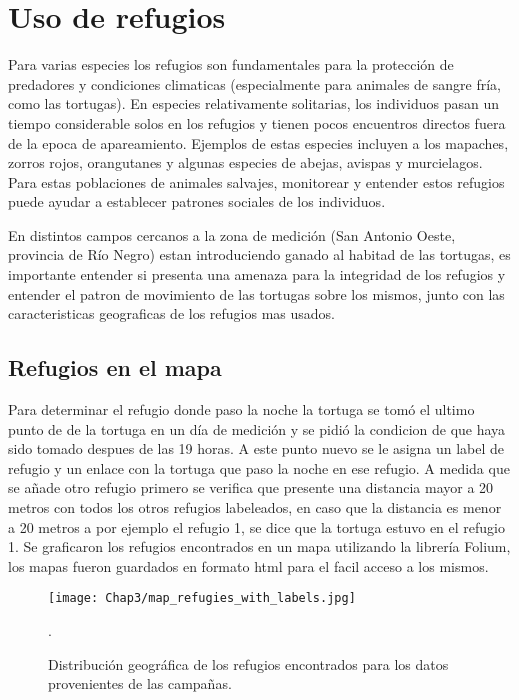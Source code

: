 \chapter{Uso de refugios}
Para varias especies los refugios son fundamentales para la protección de predadores y  condiciones climaticas (especialmente para animales de sangre fría, como las tortugas). En especies relativamente solitarias, los individuos pasan un tiempo considerable solos en los refugios y tienen pocos encuentros directos fuera de la epoca de apareamiento. %
Ejemplos de estas especies incluyen a los mapaches, zorros rojos, orangutanes y algunas especies de abejas, avispas y murcielagos. Para estas poblaciones de animales salvajes, monitorear y entender estos refugios puede ayudar a establecer patrones sociales de los individuos. 

En distintos campos cercanos a la zona de medición (San Antonio Oeste, provincia de Río Negro) estan introduciendo ganado al habitad de las tortugas, es importante entender si presenta una amenaza para la integridad de los refugios y entender el patron de movimiento  de las tortugas sobre los mismos, junto con las caracteristicas geograficas de los refugios mas usados.

\section{Refugios en el mapa}
Para determinar el refugio donde paso la noche la tortuga se tomó el ultimo punto de  de la tortuga en un día de medición y se pidió la condicion de que haya sido tomado despues de las 19 horas. A este punto nuevo se le asigna un label de refugio y un enlace con la tortuga que paso la noche en ese refugio. A medida que se añade otro refugio primero se verifica que presente una distancia mayor a 20 metros con todos los otros refugios labeleados, en caso que la distancia es menor a 20 metros a por ejemplo el refugio 1, se dice que la tortuga estuvo en el refugio 1. Se graficaron los refugios encontrados en un mapa utilizando la librería Folium, los mapas fueron guardados en formato html para el facil acceso a los mismos.
\begin{figure}[h]
    \begin{center}
        \texttt{[image: Chap3/map\_refugies\_with\_labels.jpg]}
        \caption{Distribución geográfica de los refugios encontrados para los datos provenientes de las campañas.} 
        \label{fig:refus_campanas_con_labels}.
        
        \end{center}
\end{figure} 

